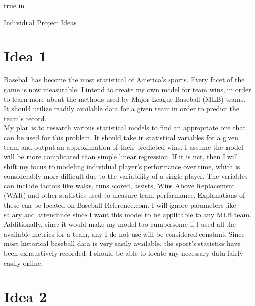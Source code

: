 \documentclass[12pt]{article}
\newcommand\tab[1][1cm]{\hspace*{#1}}
\begin{document}
\begin{doublespace}
 true in
\end{doublespace}

\vskip 12pt

\centerline{Individual Project Ideas}

\vskip 12pt
\section*{Idea 1}

	\tab Baseball has become the most statistical of America's sports.  Every facet of the game is now measurable.  I intend to create my own model for team wins, in order to learn more about the methods used by Major League Baseball (MLB) teams.  It should utilize readily available data for a given team in order to predict the team's record. \\
	\tab My plan is to research various statistical models to find an appropriate one that can be used for this problem.  It should take in statistical variables for a given team and output an approximation of their predicted wins.  I assume the model will be more complicated than simple linear regression.  If it is not, then I will shift my focus to modeling individual player's performance over time, which is considerably more difficult due to the variability of a single player.  The variables can include factors like walks, runs scored, assists, Wins Above Replacement (WAR) and other statistics used to measure team performance.  Explanations of these can be located on Baseball-Reference.com.  I will ignore parameters like salary and attendance since I want this model to be applicable to any MLB team.  Additionally, since it would make my model too cumbersome if I used all the available metrics for a team, any I do not use will be considered constant.  Since most historical baseball data is very easily available, the sport's statistics have been exhaustively recorded, I should be able to locate any necessary data fairly easily online.

\section*{Idea 2}
\end{document}
